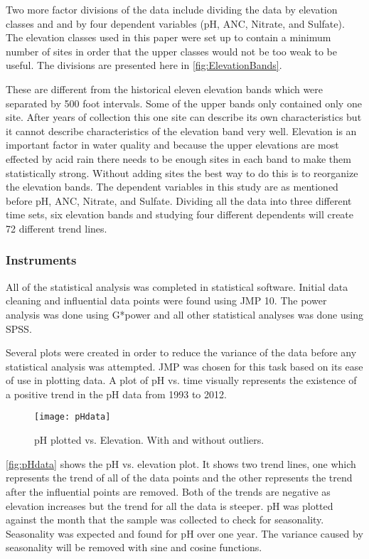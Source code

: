  Two more factor divisions of the data include dividing the data by elevation classes and and by four dependent variables (pH, ANC, Nitrate, and Sulfate).  The elevation classes used in this paper were set up to contain a minimum number of sites in order that the upper classes would not be too weak to be useful.  The divisions are presented here in \autoref{fig:ElevationBands}.

These are different from the historical eleven elevation bands which were separated by 500 foot intervals.  Some of the upper bands only contained only one site.  After years of collection this one site can describe its own characteristics but it cannot describe characteristics of the elevation band very well.  Elevation is an important factor in water quality and because the upper elevations are most effected by acid rain there needs to be enough sites in each band to make them statistically strong.  Without adding sites the best way to do this is to reorganize the elevation bands.  The dependent variables in this study are as mentioned before pH, ANC, Nitrate, and Sulfate.  %
Dividing all the data into three different time sets, six elevation bands and studying four different dependents will create 72 different trend lines.

\subsubsection{Instruments}

All of the statistical analysis was completed in statistical software.  Initial data cleaning and influential data points were found using JMP 10.  The power analysis was done using G*power and all other statistical analyses was done using SPSS.

Several plots were created in order to reduce the variance of the data before any statistical analysis was attempted.  JMP was chosen for this task based on its ease of use in plotting data.  A plot of pH vs. time visually represents the existence of a positive trend in the pH data from 1993 to 2012.
\begin{figure}[h!]
\centering
  \texttt{[image: pHdata]}\\
  \caption{pH plotted vs. Elevation.  With and without outliers.}\label{fig:pHdata}
\end{figure}
\autoref{fig:pHdata} shows the pH vs. elevation plot.  It shows two trend lines, one which represents the trend of all of the data points and the other represents the trend after the influential points are removed.  Both of the trends are negative as elevation increases but the trend for all the data is steeper.  pH was plotted against the month that the sample was collected to check for seasonality.  Seasonality was expected and found for pH over one year.  The variance caused by seasonality will be removed with sine and cosine functions. 

